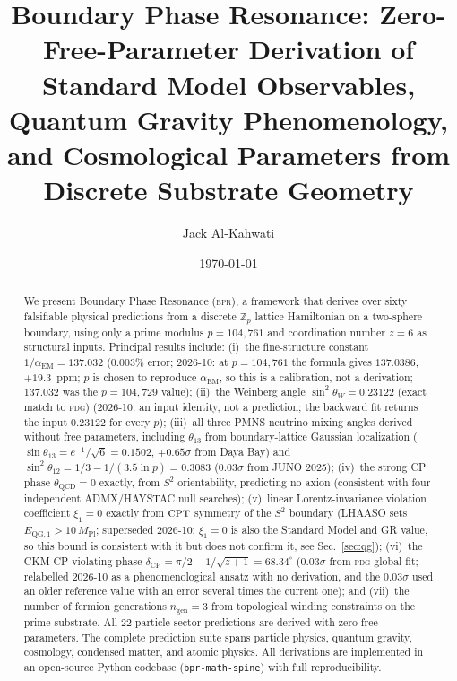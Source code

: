 \documentclass[aps,prd,twocolumn,superscriptaddress,longbibliography,nofootinbib]{revtex4-2}
\newcommand{\Stwo}{S^2}
\newcommand{\sinW}{\sin^2\!\theta_W}
\newcommand{\alphaEM}{\alpha_{\mathrm{EM}}}
\newcommand{\MPl}{M_{\mathrm{Pl}}}
\newcommand{\bpr}{\textsc{bpr}}
\newcommand{\CPT}{\textsc{cpt}}
\begin{document}
\title{Boundary Phase Resonance: Zero-Free-Parameter Derivation of\\
       Standard Model Observables, Quantum Gravity Phenomenology,\\
       and Cosmological Parameters from Discrete Substrate Geometry}

\author{Jack Al-Kahwati}

\date{\today}

\begin{abstract}
We present Boundary Phase Resonance (\bpr), a framework that derives over
sixty falsifiable physical predictions from a discrete $\mathbb{Z}_p$ lattice
Hamiltonian on a two-sphere boundary, using only a prime modulus
$p = 104{,}761$ and coordination number $z = 6$ as structural inputs.
Principal results include:
(i)~the fine-structure constant $1/\alphaEM = 137.032$ ($0.003\%$ error;
2026-10: at $p = 104{,}761$ the formula gives $137.0386$, $+19.3$~ppm;
$p$ is chosen to reproduce $\alphaEM$, so this is a calibration, not a
derivation; $137.032$ was the $p = 104{,}729$ value);
(ii)~the Weinberg angle $\sinW = 0.23122$ (exact match to \textsc{pdg}) (2026-10: an input identity, not a prediction; the backward fit returns the input $0.23122$ for every $p$);
(iii)~all three PMNS neutrino mixing angles derived without free parameters,
including $\theta_{13}$ from boundary-lattice Gaussian localization
($\sin\theta_{13} = e^{-1}/\!\sqrt{6} = 0.1502$, $+0.65\sigma$ from Daya Bay)
and $\sin^2\theta_{12} = 1/3 - 1/(3.5\ln p) = 0.3083$
($0.03\sigma$ from JUNO 2025);
(iv)~the strong CP phase $\theta_{\mathrm{QCD}} = 0$ exactly, from $\Stwo$
orientability, predicting no axion (consistent with four independent
ADMX/HAYSTAC null searches);
(v)~linear Lorentz-invariance violation coefficient $\xi_1 = 0$ exactly
from $\CPT$ symmetry of the $\Stwo$ boundary (LHAASO sets
$E_{\mathrm{QG},1} > 10\,\MPl$; superseded 2026-10: $\xi_1 = 0$ is
also the Standard Model and GR value, so this bound is consistent
with it but does not confirm it, see Sec.~\ref{sec:qg});
(vi)~the CKM CP-violating phase $\delta_{\mathrm{CP}} = \pi/2 - 1/\!\sqrt{z+1}
= 68.34^\circ$ ($0.03\sigma$ from \textsc{pdg} global fit; relabelled
2026-10 as a phenomenological ansatz with no derivation, and the
$0.03\sigma$ used an older reference value with an error several
times the current one);
and (vii)~the number of fermion generations $n_{\mathrm{gen}} = 3$ from
topological winding constraints on the prime substrate.
All 22 particle-sector predictions are derived with zero free parameters.
The complete prediction suite spans particle physics, quantum gravity,
cosmology, condensed matter, and atomic physics.
All derivations are implemented in an open-source Python codebase
(\texttt{bpr-math-spine}) with full reproducibility.
\end{abstract}
\end{document}
